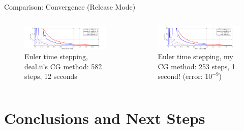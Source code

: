 \documentclass{beamer}
\begin{document}
\begin{frame}{Comparison: Convergence (Release Mode)}
\begin{columns}
            \begin{figure}
                \centering
                \includegraphics[width = \textwidth, trim={1cm 0cm 1cm 0cm},clip]{Images/euler.png}
                \caption*{Euler time stepping, deal.ii's CG method: 582 steps, 12 seconds}
                \label{fig:my_label}
            \end{figure}
            
             \vspace{-.2cm}
            
            \begin{figure}
                \centering
                \includegraphics[width = \textwidth, trim={1cm 0cm 1cm 0cm},clip]{Images/euler.png}
                \caption*{Euler time stepping, my CG method: 253 steps, 1 second! (error: $10^{-9}$)}
                \label{fig:my_label}
            \end{figure}
                
            
            \end{columns}
                
            
        \end{frame}
    
    \section[Conclusion]{Conclusions and Next Steps}
    
\end{document}
